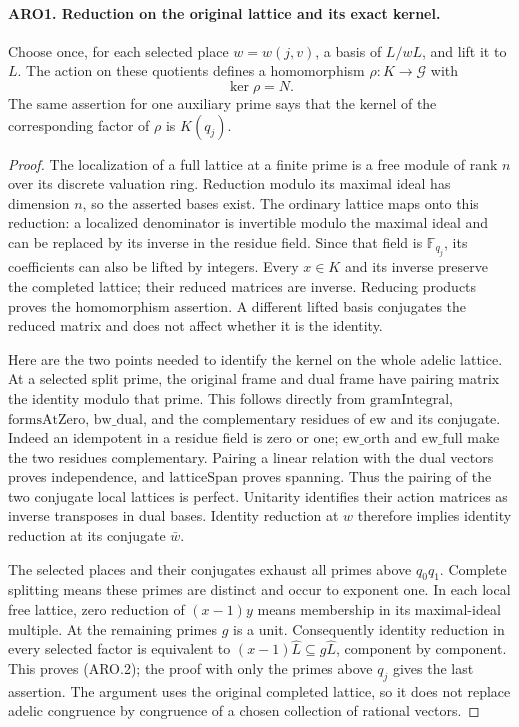 \paragraph{ARO1. Reduction on the original lattice and its exact kernel.}
\label{claim:ARO1}
Choose once, for each selected place \(w=w(j,v)\), a basis of
\(L/wL\), and lift it to \(L\).  The action on these quotients defines
a homomorphism \(\rho:K\to\mathcal G\) with
\[
                         \ker\rho=N.                 \tag{ARO.2}
\]
The same assertion for one auxiliary prime says that the kernel of
the corresponding factor of \(\rho\) is \(K(q_j)\).
\begin{proof}
The localization of a full lattice at a finite prime is a free module
of rank \(n\) over its discrete valuation ring.  Reduction modulo its
maximal ideal has dimension \(n\), so the asserted bases exist.
The ordinary lattice maps onto this reduction: a localized
denominator is invertible modulo the maximal ideal and can be
replaced by its inverse in the residue field.  Since that field is
\(\mathbb F_{q_j}\), its coefficients can also be lifted by integers.
Every \(x\in K\) and its inverse preserve the completed lattice;
their reduced matrices are inverse.  Reducing products proves the
homomorphism assertion.  A different lifted basis conjugates the
reduced matrix and does not affect whether it is the identity.

Here are the two points needed to identify the kernel on the whole
adelic lattice.  At a selected split prime, the original frame and
dual frame have pairing matrix the identity modulo that prime.
This follows directly from \(\mathrm{gramIntegral}\),
\(\mathrm{formsAtZero}\), \(\mathrm{bw\_dual}\), and the
complementary residues of \(\mathrm{ew}\) and its conjugate.
Indeed an idempotent in a residue field is zero or one;
\(\mathrm{ew\_orth}\) and \(\mathrm{ew\_full}\) make the two
residues complementary.  Pairing a linear relation with the dual
vectors proves independence, and \(\mathrm{latticeSpan}\) proves
spanning.  Thus the pairing of the two conjugate local lattices is
perfect.  Unitarity identifies their action matrices as inverse
transposes in dual bases.  Identity reduction at \(w\) therefore
implies identity reduction at its conjugate \(\bar w\).

The selected places and their conjugates exhaust all primes above
\(q_0q_1\).  Complete splitting means these primes are distinct and
occur to exponent one.  In each local free lattice, zero reduction
of \((x-1)y\) means membership in its maximal-ideal multiple.
At the remaining primes \(g\) is a unit.  Consequently identity
reduction in every selected factor is equivalent to
\((x-1)\widehat L\subseteq g\widehat L\), component by component.
This proves (ARO.2); the proof with only the primes above \(q_j\)
gives the last assertion.  The argument uses the original completed
lattice, so it does not replace adelic congruence by congruence of a
chosen collection of rational vectors.
\end{proof}

